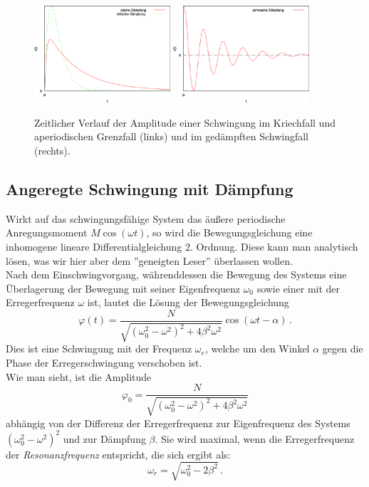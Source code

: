 \begin{figure}[ht!]
\begin{center}
\includegraphics[width=0.45\textwidth]{Abbildungen/2285.pdf}
\includegraphics[width=0.45\textwidth]{Abbildungen/2284.pdf}
\end{center}
\caption{Zeitlicher Verlauf der Amplitude einer Schwingung im Kriechfall und aperiodischen Grenzfall (links) und im gedämpften Schwingfall (rechts).}
\label{fig:Schwingungen}
\end{figure}

\subsection{Angeregte Schwingung mit Dämpfung}

Wirkt auf das schwingungsfähige System das äußere periodische Anregungsmoment $M\cos(\omega t)$, so wird die Bewegungsgleichung eine inhomogene lineare Differentialgleichung 2. Ordnung. Diese kann man analytisch lösen, was wir hier aber dem ''geneigten Leser'' überlassen wollen.\\
Nach dem Einschwingvorgang, währenddessen die Bewegung des Systems eine Überlagerung der Bewegung mit seiner Eigenfrequenz $\omega_0$ sowie einer mit der Erregerfrequenz $\omega$ ist, lautet die Lösung der Bewegungsgleichung 
\begin{equation}
	\varphi(t) = \frac{N}{\sqrt{\left(\omega_0^2 - \omega^2\right)^2 +4\beta^2\omega^2}}\cos(\omega t - \alpha)\, .
\end{equation}
Dies ist eine Schwingung mit der Frequenz $\omega_e$, welche um den Winkel $\alpha$ gegen die Phase der Erregerschwingung verschoben ist. \\
Wie man sieht, ist die Amplitude 
\begin{equation*}
	\varphi_0 = \frac{N}{\sqrt{\left(\omega_0^2 - \omega^2\right)^2 +4\beta^2\omega^2}}
\end{equation*}
abhängig von der Differenz der Erregerfrequenz zur Eigenfrequenz des Systems $\left(\omega_0^2 - \omega^2\right)^2$ und zur Dämpfung $\beta$. Sie wird maximal, wenn die Erregerfrequenz der \textit{Resonanzfrequenz} entspricht, die sich ergibt als:
\begin{equation}
	\omega_r = \sqrt{\omega_0^2 -2\beta^2}\, .
\end{equation}

